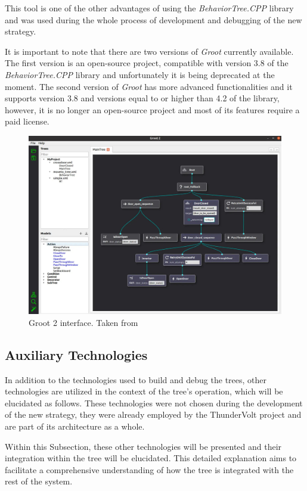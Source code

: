 This tool is one of the other advantages of using the \textit{BehaviorTree.CPP} library and was used during the whole process of development and debugging of the new strategy.

It is important to note that there are two versions of \textit{Groot} currently available. The first version is an open-source project, compatible with version 3.8 of the \textit{BehaviorTree.CPP} library and unfortunately it is being deprecated at the moment. The second version of \textit{Groot} has more advanced functionalities and it supports version 3.8 and versions equal to or higher than 4.2 of the library, however, it is no longer an open-source project and most of its features require a paid license.

\begin{figure}[h]
    \centering
    \includegraphics[width=0.75\linewidth]{chapters/development/images/Groot.jpg}
    \caption{Groot 2 interface. Taken from \cite{Groot}}
    \label{fig:groot}
\end{figure}

\subsection{Auxiliary Technologies}

In addition to the technologies used to build and debug the trees, other technologies are utilized in the context of the tree's operation, which will be elucidated as follows. These technologies were not chosen during the development of the new strategy, they were already employed by the ThunderVolt project and are part of its architecture as a whole.

Within this Subsection, these other technologies will be presented and their integration within the tree will be elucidated. This detailed explanation aims to facilitate a comprehensive understanding of how the tree is integrated with the rest of the system.

